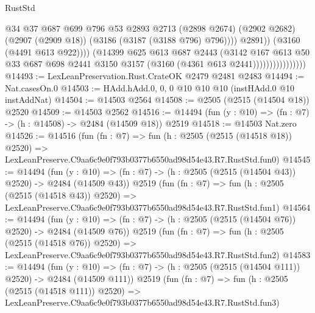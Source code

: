 \begin{lexlean}{RustStd}
\begin{coremodule}
                                        @34
                                        @37
                                        @687
                                        @699
                                        @796
                                        @53
                                        @2893
                                        @2713
                                        (@2898 @2674)
                                        (@2902 @2682)
                                        (@2907 (@2909 @18))
                                        (@3186 (@3187 (@3188 @796) @796))))
                                    @2891))
                                (@3160 (@4491 @613 @922))))
                            (@14399
                              @625
                              @613
                              @687
                              @2443
                              (@3142
                                @167
                                @613
                                @50
                                @33
                                @687
                                @698
                                @2441
                                @3150
                                @3157
                                (@3160 (@4361 @613 @2441))))))))))))))))
@14493 := LexLeanPreservation.Rust.CrateOK @2479 @2481 @2483
@14494 := Nat.casesOn.{0}
@14503 := HAdd.hAdd.{0, 0, 0} @10 @10 @10 (instHAdd.{0} @10 instAddNat)
@14504 := @14503 @2564
@14508 := @2505 (@2515 (@14504 @18)) @2520
@14509 := @14503 @2562
@14516 := @14494 (fun (y : @10) => (fn : @7) -> (h : @14508) -> @2484 (@14509 @18)) @2519
@14518 := @14503 Nat.zero
@14526 := @14516
    (fun (fn : @7) =>
    fun (h : @2505 (@2515 (@14518 @18)) @2520) =>
    LexLeanPreserve.C9aa6c9e0f793b0377b6550ad98d54e43.R7.RustStd.fun0)
@14545 := @14494
    (fun (y : @10) => (fn : @7) -> (h : @2505 (@2515 (@14504 @43)) @2520) -> @2484 (@14509 @43))
    @2519
    (fun (fn : @7) =>
    fun (h : @2505 (@2515 (@14518 @43)) @2520) =>
    LexLeanPreserve.C9aa6c9e0f793b0377b6550ad98d54e43.R7.RustStd.fun1)
@14564 := @14494
    (fun (y : @10) => (fn : @7) -> (h : @2505 (@2515 (@14504 @76)) @2520) -> @2484 (@14509 @76))
    @2519
    (fun (fn : @7) =>
    fun (h : @2505 (@2515 (@14518 @76)) @2520) =>
    LexLeanPreserve.C9aa6c9e0f793b0377b6550ad98d54e43.R7.RustStd.fun2)
@14583 := @14494
    (fun (y : @10) => (fn : @7) -> (h : @2505 (@2515 (@14504 @111)) @2520) -> @2484 (@14509 @111))
    @2519
    (fun (fn : @7) =>
    fun (h : @2505 (@2515 (@14518 @111)) @2520) =>
    LexLeanPreserve.C9aa6c9e0f793b0377b6550ad98d54e43.R7.RustStd.fun3)

\end{coremodule}
\end{lexlean}
